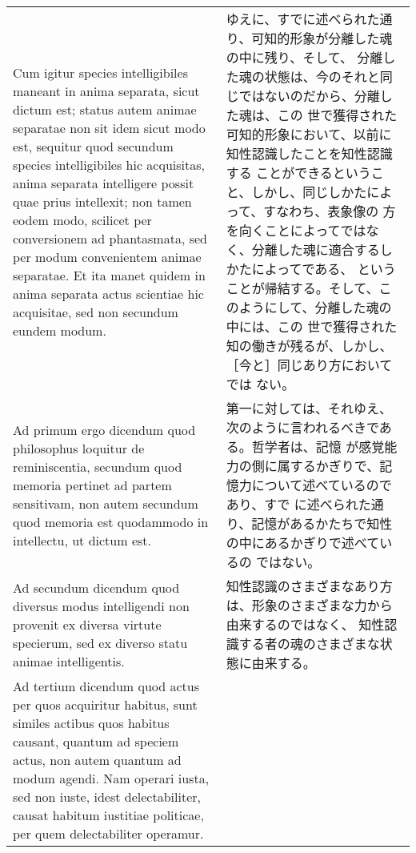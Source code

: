 \documentclass[10pt]{jsarticle} %
\begin{document}
\begin{longtable}{p{21em}p{21em}}
\\



Cum igitur species intelligibiles maneant in anima separata, sicut
dictum est; status autem animae separatae non sit idem sicut modo est,
sequitur quod secundum species intelligibiles hic acquisitas, anima
separata intelligere possit quae prius intellexit; non tamen eodem
modo, scilicet per conversionem ad phantasmata, sed per modum
convenientem animae separatae. Et ita manet quidem in anima separata
actus scientiae hic acquisitae, sed non secundum eundem modum.


&

ゆえに、すでに述べられた通り、可知的形象が分離した魂の中に残り、そして、
分離した魂の状態は、今のそれと同じではないのだから、分離した魂は、この
世で獲得された可知的形象において、以前に知性認識したことを知性認識する
ことができるということ、しかし、同じしかたによって、すなわち、表象像の
方を向くことによってではなく、分離した魂に適合するしかたによってである、
ということが帰結する。そして、このようにして、分離した魂の中には、この
世で獲得された知の働きが残るが、しかし、［今と］同じあり方においてでは
ない。

\\



{\sc Ad primum ergo dicendum} quod philosophus loquitur de
reminiscentia, secundum quod memoria pertinet ad partem sensitivam,
non autem secundum quod memoria est quodammodo in intellectu, ut
dictum est.

&

第一に対しては、それゆえ、次のように言われるべきである。哲学者は、記憶
が感覚能力の側に属するかぎりで、記憶力について述べているのであり、すで
に述べられた通り、記憶があるかたちで知性の中にあるかぎりで述べているの
ではない。


\\


{\sc Ad secundum dicendum} quod diversus modus intelligendi non
provenit ex diversa virtute specierum, sed ex diverso statu animae
intelligentis.

&

知性認識のさまざまなあり方は、形象のさまざまな力から由来するのではなく、
知性認識する者の魂のさまざまな状態に由来する。

\\



{\sc Ad tertium dicendum} quod actus per quos acquiritur habitus, sunt
similes actibus quos habitus causant, quantum ad speciem actus, non
autem quantum ad modum agendi. Nam operari iusta, sed non iuste, idest
delectabiliter, causat habitum iustitiae politicae, per quem
delectabiliter operamur.


\end{longtable}
\end{document}
